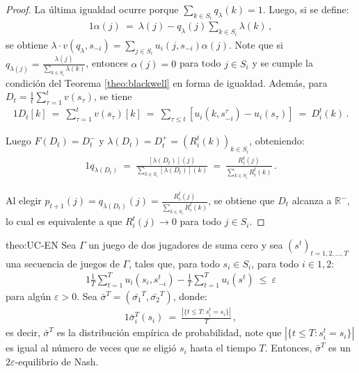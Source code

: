 \begin{proof}
La última igualdad ocurre porque $\sum_{k\in S_i} q_{\lambda}(k)=1$. Luego, si se define:
\begin{alignat}{1}
	\alpha(j)\ =\ \lambda(j) - q_{\lambda}(j) \sum_{k \in S_i} \lambda(k) \,,
\end{alignat}
se obtiene $\lambda \cdot v(q_{\lambda}, s_{-i}) = \sum_{j \in S_i} u_i(j, s_{-i})\alpha(j)$.
Note que si $q_{\lambda(j)} = \frac{\lambda(j)}{\sum_{k \in S_i} \lambda(k)}$, entonces $\alpha(j) = 0$ para todo $j \in S_i$ y se cumple la condición del Teorema \ref{theo:blackwell} en forma de igualdad. Además, para $D_t=\frac{1}{t} \sum_{\tau = 1}^{t} v(s_{\tau})$, se tiene
\begin{alignat}{1}
	D_t[k]\ =\ \sum_{\tau = 1}^{t} v(s_{\tau})[k]\ =\ \sum_{\tau \leq t }[u_i(k, s_{-i}^{\tau}) - u_i(s_{\tau})]\ =\  D_i^t(k) \,.
\end{alignat}

Luego $F(D_t) = D_t^-$ y $\lambda(D_t) = D_t^+ = (R_i^t(k))_{k \in S_i}$, obteniendo:
\begin{alignat}{1}
	q_{\lambda(D_t)}\ =\ \frac{[\lambda(D_t)](j)}{\sum_{k \in S_i}[\lambda(D_t)](k)}\ =\ \frac{R_i^t(j)}{\sum_{k \in S_i} R_i^t(k)} \,.
\end{alignat}

Al elegir $p_{t+1}(j) = q_{\lambda(D_t)}(j) = \frac{R_i^t (j)}{\sum_{k \in S_i} R_i^t(k)}$, se obtiene que $D_t$ alcanza a $\mathbb{R^-}$, lo cual es equivalente a que $R_i^t(j) \rightarrow 0$ para todo $j \in S_i$.
\end{proof}


\begin{reptheorem}{theo:UC-EN}
Sea $\Gamma$ un juego de dos jugadores de suma cero y sea $(s^t)_{t=1,2,..., T}$ una secuencia de juegos de $\Gamma$, tales que, para todo $s_i \in S_i$, para todo $i \in {1, 2}$:
\begin{alignat}{1}
\frac{1}{T}\sum_{t = 1}^{T}u_i(s_i, s_{-i}^t) - \frac{1}{T} \sum_{t = 1}^T u_i(s^t)\ \leq\ \varepsilon
\end{alignat}
para algún $\varepsilon > 0$. Sea $\bar{\sigma}^T = (\bar{\sigma_1}^T, \bar{\sigma_2}^T)$, donde:
\begin{alignat}{1}
\bar{\sigma}_i^T(s_i)\ =\ \frac{|\{ t \leq T : s_i^t = s_i\}|}{T} \,,
\end{alignat}
es decir, $\bar{\sigma}^T$ es la distribución empírica de probabilidad, note que $|\{ t \leq T : s_i^t = s_i\}|$ es igual al número de veces que se eligió $s_i$ hasta el tiempo $T$. Entonces, $\bar{\sigma}^T$ es un $2\varepsilon$-equilibrio de Nash.
\end{reptheorem}


